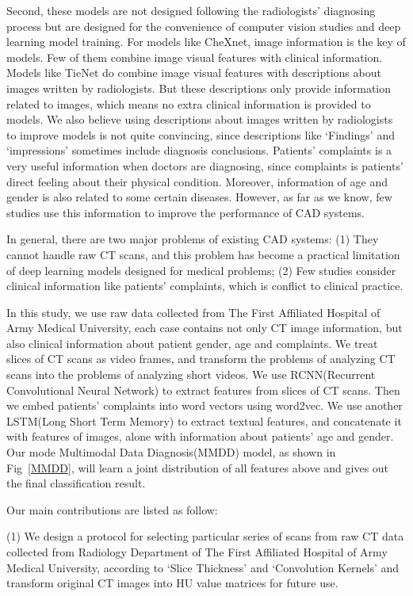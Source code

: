 \documentclass[journal]{IEEEtran}
\begin{document}
Second, these models are not designed following the radiologists' diagnosing process but are designed for the convenience of computer vision studies and deep learning model training. For models like CheXnet, image information is the key of models. Few of them combine image visual features with clinical information. Models like TieNet do combine image visual features with descriptions about images written by radiologists. But these descriptions only provide information related to images, which means no extra clinical information is provided to models. We also believe using descriptions about images written by radiologists to improve models is not quite convincing, since descriptions like `Findings' and `impressions' sometimes include diagnosis conclusions.
Patients' complaints is a very useful information when doctors are diagnosing, since complaints is patients' direct feeling about their physical condition. Moreover, information of age and gender is also related to some certain diseases. However, as far as we know, few studies use this information to improve the performance of CAD systems. 

In general, there are two major problems of existing CAD systems: (1) They cannot handle raw CT scans, and this problem has become a practical limitation of deep learning models designed for medical problems; (2) Few studies consider clinical information like patients' complaints, which is conflict to clinical practice.

In this study, we use raw data collected from The First Affiliated Hospital of Army Medical University, each case contains not only CT image information, but also clinical information about patient gender, age and complaints. 
We treat slices of CT scans as video frames, and transform the problems of analyzing CT scans into the problems of analyzing short videos. We use RCNN(Recurrent Convolutional Neural Network) to extract features from slices of CT scans. Then we embed patients' complaints into word vectors using word2vec\cite{mikolov2013efficient}\cite{mikolov2013distributed}. We use another LSTM(Long Short Term Memory) to extract textual features, and concatenate it with features of images, alone with information about patients' age and gender. Our mode Multimodal Data Diagnosis(MMDD) model, as shown in Fig~\ref{MMDD}, will learn a joint distribution of all features above and gives out the final classification result.

Our main contributions are listed as follow:

(1) We design a protocol for selecting particular series of scans from raw CT data collected from Radiology Department of The First Affiliated Hospital of Army Medical University, according to `Slice Thickness' and `Convolution Kernels' and transform original CT images into HU value matrices for future use. 
\end{document}
